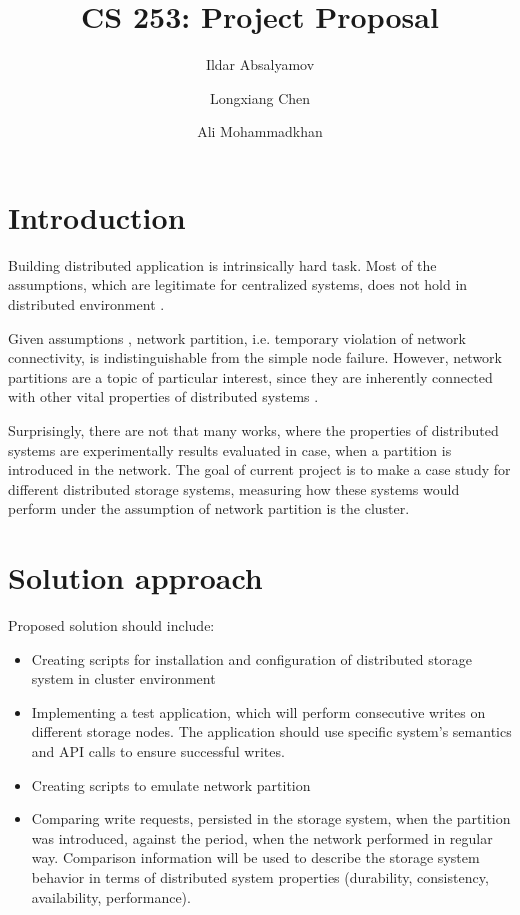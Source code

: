 \documentclass[a4paper]{article}
\title{CS 253: Project Proposal}
\author{Ildar Absalyamov \and Longxiang Chen \and Ali Mohammadkhan}
\begin{document}
\maketitle

\section*{Introduction}

Building distributed application is intrinsically hard task.
Most of the assumptions, which are legitimate for centralized systems, does not hold in distributed environment \cite{deutsch1992eight}.

Given assumptions \cite{deutsch1992eight}, network partition, i.e. temporary violation of network connectivity, is indistinguishable from the simple node failure. 
However, network partitions are a topic of particular interest, since they are inherently connected with other vital properties of distributed systems \cite{brewer2000towards}.

Surprisingly, there are not that many works, where the properties of distributed systems are experimentally results evaluated in case, when a partition is introduced in the network.
The goal of current project is to make a case study for different distributed storage systems, measuring how these systems would perform under the assumption of network partition is the cluster.

\section*{Solution approach}

Proposed solution should include:
\begin{itemize}
	\item Creating scripts for installation and configuration of distributed storage system in cluster environment
	\item Implementing a test application, which will perform consecutive writes on different storage nodes. The application should use specific system's semantics and API calls to ensure successful writes.
	\item Creating scripts to emulate network partition  
	\item Comparing write requests, persisted in the storage system, when the partition was introduced, against the period, when the network performed in regular way. Comparison information will be used to describe the storage system behavior in terms of distributed system properties (durability, consistency, availability, performance).
\end{itemize}
\end{document}
